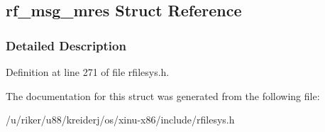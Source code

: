 \hypertarget{structrf__msg__mres}{}\subsection{rf\+\_\+msg\+\_\+mres Struct Reference}
\label{structrf__msg__mres}


\subsubsection{Detailed Description}


Definition at line 271 of file rfilesys.\+h.



The documentation for this struct was generated from the following file\+:\begin{DoxyCompactItemize}
\item 
/u/riker/u88/kreiderj/os/xinu-\/x86/include/rfilesys.\+h\end{DoxyCompactItemize}
